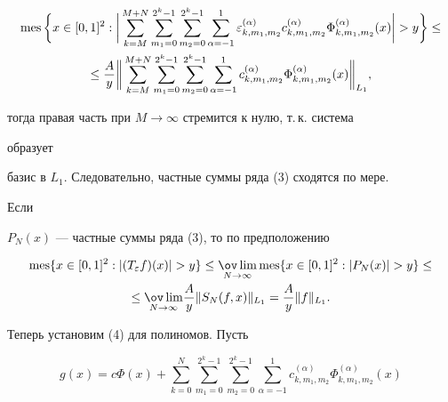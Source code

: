 \begin{multline*} 


\mes\bigg\{x\in[0,1]^2:\bigg|\sum^{M+N}_{k=M} 


\sum^{2^k-1}_{m_1=0}\sum^{2^k-1}_{m_2=0} 


\sum^1_{\alpha=-1}\varepsilon^{(\alpha)}_{k,m_1,m_2} 


c^{(\alpha)}_{k,m_1,m_2}\Phi^{(\alpha)}_{k,m_1,m_2}(x) 


\bigg|>y\bigg\}\le \\ 


% 


\le\frac{A}{y}\bigg\| 


\sum^{M+N}_{k=M}\sum^{2^k-1}_{m_1=0}\sum^{2^k-1}_{m_2=0} 


\sum^1_{\alpha=-1} 


c^{(\alpha)}_{k,m_1,m_2}\Phi^{(\alpha)}_{k,m_1,m_2} 


(x)\bigg\|_{L_1},


\end{multline*} 


тогда правая часть при $M\to\infty$ стремится к нулю, т.\,к. система 


образует 


базис в $L_1$. Следовательно, частные суммы ряда (3) сходятся по мере. 


Если 


$P_N(x)$ --- частные суммы ряда (3), то по предположению 


\begin{multline*}  


\mes\{x\in[0,1]^2:|(T_\varepsilon f)(x)|>y\}\le 


\underset{N\to\infty}{\ov \lim}{}\mes\{x\in[0,1]^2: 


|P_N(x)|>y\}\le\\


\le \underset{N\to\infty}{\ov \lim}{}


\frac{A}{y}\|S_N(f,x)\|_{L_1}=\frac{A}{y}\|f\|_{L_1}. 


\end{multline*}  


Теперь установим (4) для полиномов. Пусть 


$$ 


g(x)=c\Phi(x)+\sum^N_{k=0}\sum^{2^k-1}_{m_1=0}\sum^{2^k-1}_{m_2=0} 


\sum^1_{\alpha=-1}c^{(\alpha)}_{k,m_1,m_2} 


\Phi^{(\alpha)}_{k,m_1,m_2}(x) 


$$ 



